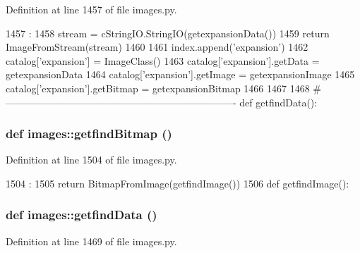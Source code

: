 Definition at line 1457 of file images.py.


\begin{DoxyCode}
1457                        :
1458     stream = cStringIO.StringIO(getexpansionData())
1459     return ImageFromStream(stream)
1460 
1461 index.append('expansion')
1462 catalog['expansion'] = ImageClass()
1463 catalog['expansion'].getData = getexpansionData
1464 catalog['expansion'].getImage = getexpansionImage
1465 catalog['expansion'].getBitmap = getexpansionBitmap
1466 
1467 
1468 #----------------------------------------------------------------------
def getfindData():
\end{DoxyCode}
\hypertarget{namespaceimages_ac63043f1f2ef99caf8662784d88b109e}{
\subsubsection[{getfindBitmap}]{\setlength{\rightskip}{0pt plus 5cm}def images::getfindBitmap ()}}
\label{namespaceimages_ac63043f1f2ef99caf8662784d88b109e}


Definition at line 1504 of file images.py.


\begin{DoxyCode}
1504                    :
1505     return BitmapFromImage(getfindImage())
1506 
def getfindImage():
\end{DoxyCode}
\hypertarget{namespaceimages_a0a168003e10f90a3e3d4b2a21168e700}{
\subsubsection[{getfindData}]{\setlength{\rightskip}{0pt plus 5cm}def images::getfindData ()}}
\label{namespaceimages_a0a168003e10f90a3e3d4b2a21168e700}


Definition at line 1469 of file images.py.


